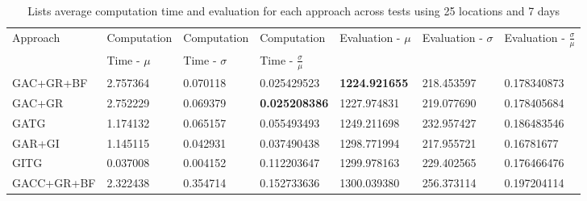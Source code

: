 \begin{table}[H]
    \centering
    \caption{Lists average computation time and evaluation for each approach across tests using 25 locations and 7 days}\label{tab:averages-25-locations-7-days}
    \scriptsize
    \begin{tabular}{lllllll}
        Approach   & Computation  & Computation & Computation & Evaluation - $\mu$ & Evaluation - $\sigma$ & Evaluation - $\frac{\sigma}{\mu}$ \\
                   & Time - $\mu$ & Time - $\sigma$ & Time - $\frac{\sigma}{\mu}$ & & & \\
        GAC+GR+BF  & 2.757364                                                            & 0.070118                                                              & 0.025429523                                                                        & \textbf{1224.921655} & 218.453597            & 0.178340873                       \\
        GAC+GR     & 2.752229                                                            & 0.069379                                                              & \textbf{0.025208386}                                                               & 1227.974831          & 219.077690            & 0.178405684                       \\
        GATG       & 1.174132                                                            & 0.065157                                                              & 0.055493493                                                                        & 1249.211698          & 232.957427            & 0.186483546                       \\
        GAR+GI     & 1.145115                                                            & 0.042931                                                              & 0.037490438                                                                        & 1298.771994          & 217.955721            & 0.16781677                        \\
        GITG       & 0.037008                                                            & 0.004152                                                              & 0.112203647                                                                        & 1299.978163          & 229.402565            & 0.176466476                       \\
        GACC+GR+BF & 2.322438                                                            & 0.354714                                                              & 0.152733636                                                                        & 1300.039380          & 256.373114            & 0.197204114                       \\

\end{tabular}
\end{table}
